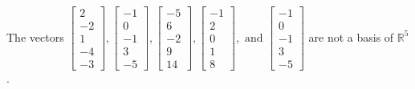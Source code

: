 \begin{exercise}
\begin{exerciseStatement}
  \end{exerciseStatement}
  \begin{exerciseAnswer}
   The vectors \(\left[\begin{array}{r}
2 \\
-2 \\
1 \\
-4 \\
-3
\end{array}\right] , \left[\begin{array}{r}
-1 \\
0 \\
-1 \\
3 \\
-5
\end{array}\right] , \left[\begin{array}{r}
-5 \\
6 \\
-2 \\
9 \\
14
\end{array}\right] , \left[\begin{array}{r}
-1 \\
2 \\
0 \\
1 \\
8
\end{array}\right] , \text{ and } \left[\begin{array}{r}
-1 \\
0 \\
-1 \\
3 \\
-5
\end{array}\right]\) 
  	 are not  a basis of \(\mathbb{R}^5\).
  


  \end{exerciseAnswer}
\end{exercise}